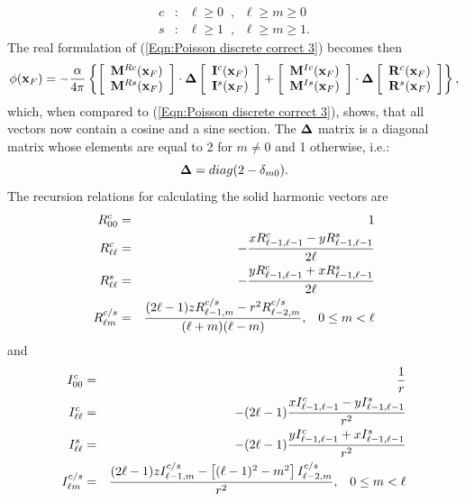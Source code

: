 \begin{eqnarray}
c & : & \ell\geq 0\;\;,\;\;\ell\geq m \geq 0 \\
s & : & \ell\geq 1\;\;,\;\;\ell\geq m \geq 1.
\end{eqnarray}
The real formulation of (\ref{Eqn:Poisson discrete correct 3}) becomes then
\begin{equation}
\label{Eqn:Poisson discrete correct real}
\phi({\bf x}_F) = -{\alpha\over 4\pi}\left\{
\left[\begin{array}{l}
{\bf M}^{Rc}({\bf x}_F) \\
{\bf M}^{Rs}({\bf x}_F)
\end{array}\right]
\cdot {\bf \Delta}
\left[\begin{array}{l}
{\bf I}^c({\bf x}_F) \\
{\bf I}^s({\bf x}_F)
\end{array}\right]
+
\left[\begin{array}{l}
{\bf M}^{Ic}({\bf x}_F) \\
{\bf M}^{Is}({\bf x}_F)
\end{array}\right]
\cdot {\bf \Delta}
\left[\begin{array}{l}
{\bf R}^c({\bf x}_F) \\
{\bf R}^s({\bf x}_F)
\end{array}\right]\right\},
\end{equation}
which, when compared to (\ref{Eqn:Poisson discrete correct 3}), shows, that all vectors now
contain a cosine and a sine section. The ${\bf \Delta}$ matrix is a diagonal matrix whose elements
are equal to 2 for $m\neq 0$ and 1 otherwise, i.e.:
\begin{equation}
\label{Eqn:Delta matrix}
{\bf \Delta} = diag(2-\delta_{m0}).
\end{equation}
The recursion relations for calculating the solid harmonic vectors are
\begin{eqnarray}
R_{00}^c & = & 1 \label{Eqn:Regular Recurrence} \\
R_{\ell\ell}^c & = & - {xR_{\ell-1,\ell-1}^c-yR_{\ell-1,\ell-1}^s\over 2\ell}\\
R_{\ell\ell}^s & = & - {yR_{\ell-1,\ell-1}^c+xR_{\ell-1,\ell-1}^s\over 2\ell}\\
R_{\ell m}^{c/s} & = & {(2\ell - 1)zR_{\ell-1,m}^{c/s}-r^2R_{\ell-2,m}^{c/s}
                       \over (\ell + m)(\ell - m)},\;\;\;0\leq m <\ell
\end{eqnarray}
and
\begin{eqnarray}
I_{00}^c & = & {1\over r} \\
I_{\ell\ell}^c & = & - (2\ell-1){xI_{\ell-1,\ell-1}^c-yI_{\ell-1,\ell-1}^s\over r^2} \\
I_{\ell\ell}^s & = & - (2\ell-1){yI_{\ell-1,\ell-1}^c+xI_{\ell-1,\ell-1}^s\over r^2} \\
I_{\ell m}^{c/s} & = & {(2\ell - 1)zI_{\ell-1,m}^{c/s}-\left[(\ell-1)^2-m^2\right]
                       I_{\ell-2,m}^{c/s}\over r^2},\;\;\;0\leq m <\ell
\label{Eqn:Irregular Recurrence}
\end{eqnarray}

